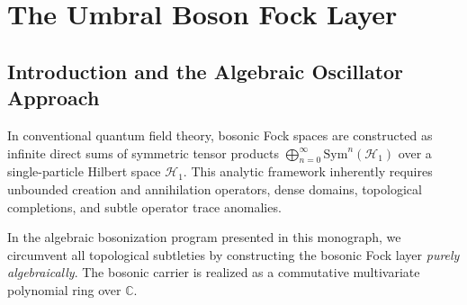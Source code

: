 \chapter{The Umbral Boson Fock Layer}
\label{ch:boson_fock}

\section{Introduction and the Algebraic Oscillator Approach}

In conventional quantum field theory, bosonic Fock spaces are constructed as infinite direct sums of symmetric tensor products $\bigoplus_{n=0}^\infty \mathrm{Sym}^n(\mathcal{H}_1)$ over a single-particle Hilbert space $\mathcal{H}_1$. This analytic framework inherently requires unbounded creation and annihilation operators, dense domains, topological completions, and subtle operator trace anomalies.

In the algebraic bosonization program presented in this monograph, we circumvent all topological subtleties by constructing the bosonic Fock layer \emph{purely algebraically}. The bosonic carrier is realized as a commutative multivariate polynomial ring over $\mathbb{C}$. 

